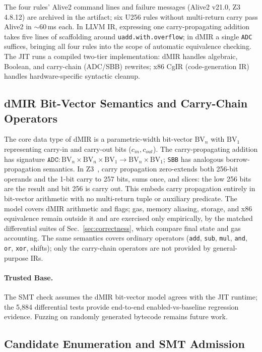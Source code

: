 The four rules' Alive2 command lines and failure messages (Alive2 v21.0,
Z3 4.8.12) are archived in the artifact; six U256 rules without
multi-return carry pass Alive2 in $\sim$60\,ms each. In LLVM IR,
expressing one carry-propagating addition takes five lines of scaffolding
around \texttt{uadd.with.overflow}; in dMIR a single \texttt{ADC}
suffices, bringing all four rules into the scope of automatic
equivalence checking. The JIT runs a compiled two-tier implementation:
dMIR handles algebraic, Boolean, and carry-chain (ADC/SBB) rewrites;
x86 CgIR (code-generation IR) handles hardware-specific syntactic cleanup.

\subsection{dMIR Bit-Vector Semantics and Carry-Chain Operators}
\label{sec:bvmodel}

The core data type of dMIR is a parametric-width bit-vector
$\mathrm{BV}_n$ with $\mathrm{BV}_1$ representing carry-in and carry-out
bits ($c_{in}, c_{out}$). The carry-propagating addition has signature
$\texttt{ADC}: \mathrm{BV}_n \times \mathrm{BV}_n \times \mathrm{BV}_1
\to \mathrm{BV}_n \times \mathrm{BV}_1$; \texttt{SBB} has analogous
borrow-propagation semantics. In
Z3~\cite{demoura2008z3}, carry propagation zero-extends both 256-bit
operands and the 1-bit carry to 257 bits, sums once, and slices: the
low 256 bits are the result and bit 256 is carry out. This embeds carry
propagation entirely in bit-vector arithmetic with no multi-return tuple
or auxiliary predicate. The model covers dMIR arithmetic and flags; gas,
memory aliasing, storage, and x86 equivalence remain outside it and are
exercised only empirically, by the matched differential suites of
Sec.~\ref{sec:correctness}, which compare final state and gas accounting. The same
semantics covers ordinary operators
(\texttt{add}, \texttt{sub}, \texttt{mul}, \texttt{and}, \texttt{or},
\texttt{xor}, shifts); only the carry-chain operators are not provided
by general-purpose IRs.

\paragraph{Trusted Base.} The SMT check assumes the dMIR bit-vector model
agrees with the JIT runtime; the 5{,}884 differential tests provide
end-to-end enabled-vs-baseline regression evidence. Fuzzing on randomly
generated bytecode remains future work.

\subsection{Candidate Enumeration and SMT Admission}
\label{sec:synthesis}

